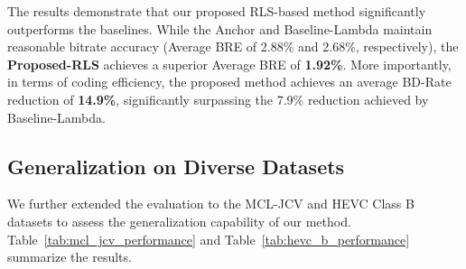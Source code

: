 The results demonstrate that our proposed RLS-based method significantly outperforms the baselines. While the Anchor and Baseline-Lambda maintain reasonable bitrate accuracy (Average BRE of 2.88\% and 2.68\%, respectively), the \textbf{Proposed-RLS} achieves a superior Average BRE of \textbf{1.92\%}. More importantly, in terms of coding efficiency, the proposed method achieves an average BD-Rate reduction of \textbf{14.9\%}, significantly surpassing the 7.9\% reduction achieved by Baseline-Lambda.


\subsection{Generalization on Diverse Datasets}

We further extended the evaluation to the MCL-JCV and HEVC Class B datasets to assess the generalization capability of our method. Table~\ref{tab:mcl_jcv_performance} and Table~\ref{tab:hevc_b_performance} summarize the results.

